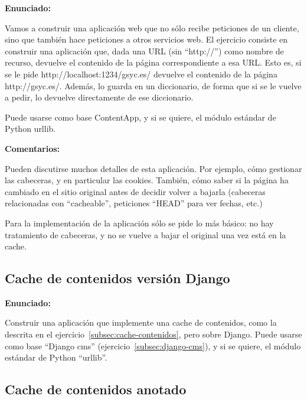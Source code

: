 \textbf{Enunciado:}

Vamos a construir una aplicación web que no sólo recibe peticiones de un cliente, sino que también hace peticiones a otros servicios web. El ejercicio consiste en construir una aplicación que, dada una URL (sin ``http://'') como nombre de recurso, devuelve el contenido de la página correspondiente a esa URL. Esto es, si se le pide http://localhost:1234/gsyc.es/ devuelve el contenido de la página http://gsyc.es/. Además, lo guarda en un diccionario, de forma que si se le vuelve a pedir, lo devuelve directamente de ese diccionario.

Puede usarse como base ContentApp, y si se quiere, el módulo estándar de Python urllib.

\textbf{Comentarios:}

Pueden discutirse muchos detalles de esta aplicación. Por ejemplo, cómo gestionar las cabeceras, y en particular las cookies. También, cómo saber si la página ha cambiado en el sitio original antes de decidir volver a bajarla (cabeceras relacionadas con ``cacheable'', peticiones ``HEAD'' para ver fechas, etc.)

Para la implementación de la aplicación sólo se pide lo más básico: no hay tratamiento de cabeceras, y no se vuelve a bajar el original una vez está en la cache.

\subsection{Cache de contenidos versión Django}
\label{subsec:cache-contenidos-django}

\textbf{Enunciado:}

Construir una aplicación que implemente una cache de contenidos, como la descrita en el ejercicio~\ref{subsec:cache-contenidos}, pero sobre Django.
Puede usarse como base ``Django cms'' (ejercicio~\ref{subsec:django-cms}), y si se quiere, el módulo estándar de Python ``urllib''.

\subsection{Cache de contenidos anotado}
\label{subsec:cache-contenidos-anotado}

